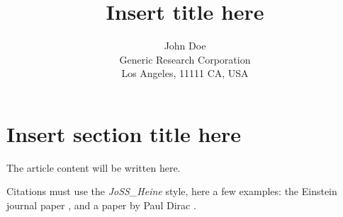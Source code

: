 \documentclass[conference]{joss-pretty}
\title{Insert title here}
\author{
John Doe \\
Generic Research Corporation\\
Los Angeles, 11111 CA, USA
}
\begin{document}
\maketitle
\section{Insert section title here}
The article content will be written here.

Citations must use the \textit{JoSS\_Heine} style, here a few examples: the Einstein journal paper \cite{einstein}, and a paper by Paul Dirac \cite{dirac}.



\end{document}
